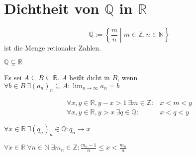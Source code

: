 \chapter{Dichtheit von $\mathbb{Q}$ in $\mathbb{R}$}

\[ \mathbb{Q} := \left\{ \frac{m}{n} \middle| m \in \mathbb{Z}, n \in \mathbb{N} \right\} \] ist die Menge retionaler Zahlen.
\begin{remark}
  $\mathbb{Q} \subsetneq \mathbb{R}$
\end{remark}

\begin{definition}
  Es sei $A \subseteq B \subseteq \mathbb{R}$. $A$ heißt dicht in $B$, wenn $\forall b \in B\: \exists (a_n)_n \subseteq A: \lim_{n \to \infty} a_n = b$
\end{definition}

\begin{lemma}
  \begin{align*}
    \forall x, y \in \mathbb{R}, y-x>1\: \exists m \in \mathbb{Z}: &x<m<y \\
    \forall x, y \in \mathbb{R}, y > x\: \exists q \in \mathbb{Q}: &x<q<y
  \end{align*}
\end{lemma}

\begin{remark}
  $\forall x \in \mathbb{R}\: \exists (q_n)_n \in \mathbb{Q}: q_n \to x$
\end{remark}

\begin{lemma}
  $\forall x \in \mathbb{R}\: \forall n \in \mathbb{N}\: \exists m_n \in \mathbb{Z}: \frac{m_n-1}{n} \le x < \frac{m_n}{n}$
\end{lemma}